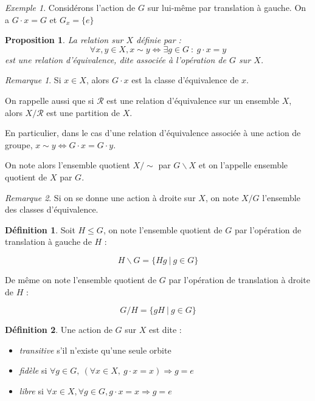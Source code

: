\documentclass[]{article}
\newtheorem{myproposition}{Proposition}
\theoremstyle{remark}
\newtheorem{myrem}{Remarque}
\newtheorem{myexmpl}{Exemple}
\theoremstyle{definition}
\newtheorem{mydef}{Définition}
\begin{document}
\begin{myexmpl}
	Considérons l'action de $G$ sur lui-même par translation à gauche.	
	On a $G \cdot x = G$ et $G_x=\{e\}$
\end{myexmpl}

\begin{myproposition}
	La relation sur $X$ définie par :
	$$\forall x, y \in X, x \sim y \Longleftrightarrow \exists g \in G ~ : ~ g \cdot x = y$$
	est une relation d'équivalence, dite \textit{associée à l'opération de $G$ sur $X$}.
\end{myproposition}

\begin{myrem}
	Si $x \in X$, alors $G \cdot x$ est la classe d'équivalence de $x$.
	
	On rappelle aussi que si $\mathcal{R}$ est une relation d'équivalence sur un ensemble $X$, alors $X / \mathcal{R}$ est une partition de $X$.
	
	En particulier, dans le cas d'une relation d'équivalence associée à une action de groupe, $x \sim y \Longleftrightarrow G \cdot x = G \cdot y$.
\end{myrem}

On note alors l'ensemble quotient $X / \sim$ par $G \backslash X$ et on l'appelle ensemble quotient de $X$ par $G$.

\begin{myrem}
	Si on se donne une action à droite sur $X$, on note $X/G$ l'ensemble des classes d'équivalence.
\end{myrem}

\begin{mydef}
	Soit $H \leqslant G$, on note l'ensemble quotient de $G$ par l'opération de translation à gauche de $H$ :
	
	$$H \backslash G = \{Hg ~ | ~ g \in G\}$$
	
	De même on note l'ensemble quotient de $G$ par l'opération de translation à droite de $H$ :
	
	$$G / H = \{gH ~ | ~ g \in G\}$$
\end{mydef}

\begin{mydef}
	Une action de $G$ sur $X$ est dite :
	\begin{itemize}
		\item \textit{transitive} s'il n'existe qu'une seule orbite
		\item \textit{fidèle} si $\forall g \in G, ~ (\forall x \in X, ~ g \cdot x = x) \Longrightarrow g=e$
		\item \textit{libre} si $\forall x \in X, \forall g \in G, g \cdot x = x \Longrightarrow g=e$
	\end{itemize}
\end{mydef}
\end{document}

